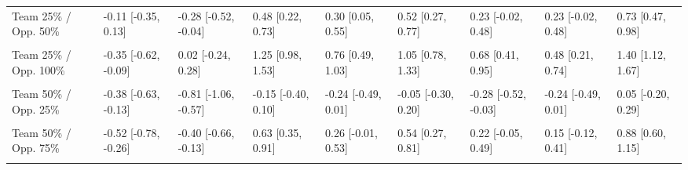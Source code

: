 \documentclass[]{elsarticle} %
\begin{document}
\begin{landscape}
\begin{table}
{\begin{tabular}[t]{lllllllll}
Team 25\% / Opp. 50\% & -0.11 [-0.35, 0.13] & -0.28 [-0.52, -0.04] & 0.48 [0.22, 0.73] & 0.30 [0.05, 0.55] & 0.52 [0.27, 0.77] & 0.23 [-0.02, 0.48] & 0.23 [-0.02, 0.48] & 0.73 [0.47, 0.98]\\
\cellcolor{gray!6}{Team 25\% / Opp. 75\%} & \cellcolor{gray!6}{-0.22 [-0.47, 0.03]} & \cellcolor{gray!6}{-0.13 [-0.38, 0.12]} & \cellcolor{gray!6}{0.87 [0.61, 1.13]} & \cellcolor{gray!6}{0.51 [0.26, 0.77]} & \cellcolor{gray!6}{0.79 [0.53, 1.05]} & \cellcolor{gray!6}{0.49 [0.23, 0.74]} & \cellcolor{gray!6}{0.42 [0.17, 0.67]} & \cellcolor{gray!6}{1.13 [0.87, 1.39]}\\
Team 25\% / Opp. 100\% & -0.35 [-0.62, -0.09] & 0.02 [-0.24, 0.28] & 1.25 [0.98, 1.53] & 0.76 [0.49, 1.03] & 1.05 [0.78, 1.33] & 0.68 [0.41, 0.95] & 0.48 [0.21, 0.74] & 1.40 [1.12, 1.67]\\
\addlinespace
\cellcolor{gray!6}{Team 50\% / Opp. 0\%} & \cellcolor{gray!6}{-0.34 [-0.58, -0.10]} & \cellcolor{gray!6}{-1.04 [-1.27, -0.80]} & \cellcolor{gray!6}{-0.57 [-0.81, -0.34]} & \cellcolor{gray!6}{-0.52 [-0.75, -0.29]} & \cellcolor{gray!6}{-0.37 [-0.60, -0.14]} & \cellcolor{gray!6}{-0.54 [-0.77, -0.31]} & \cellcolor{gray!6}{-0.42 [-0.65, -0.19]} & \cellcolor{gray!6}{-0.37 [-0.60, -0.15]}\\
Team 50\% / Opp. 25\% & -0.38 [-0.63, -0.13] & -0.81 [-1.06, -0.57] & -0.15 [-0.40, 0.10] & -0.24 [-0.49, 0.01] & -0.05 [-0.30, 0.20] & -0.28 [-0.52, -0.03] & -0.24 [-0.49, 0.01] & 0.05 [-0.20, 0.29]\\
\cellcolor{gray!6}{Team 50\% / Opp. 50\%} & \cellcolor{gray!6}{-0.40 [-0.67, -0.14]} & \cellcolor{gray!6}{-0.54 [-0.81, -0.28]} & \cellcolor{gray!6}{0.23 [-0.04, 0.50]} & \cellcolor{gray!6}{0.05 [-0.22, 0.31]} & \cellcolor{gray!6}{0.27 [0.00, 0.54]} & \cellcolor{gray!6}{-0.03 [-0.30, 0.23]} & \cellcolor{gray!6}{-0.05 [-0.31, 0.22]} & \cellcolor{gray!6}{0.48 [0.21, 0.75]}\\
Team 50\% / Opp. 75\% & -0.52 [-0.78, -0.26] & -0.40 [-0.66, -0.13] & 0.63 [0.35, 0.91] & 0.26 [-0.01, 0.53] & 0.54 [0.27, 0.81] & 0.22 [-0.05, 0.49] & 0.15 [-0.12, 0.41] & 0.88 [0.60, 1.15]\\
\cellcolor{gray!6}{Team 50\% / Opp. 100\%} & \cellcolor{gray!6}{-0.65 [-0.93, -0.37]} & \cellcolor{gray!6}{-0.24 [-0.52, 0.03]} & \cellcolor{gray!6}{1.01 [0.72, 1.30]} & \cellcolor{gray!6}{0.51 [0.22, 0.79]} & \cellcolor{gray!6}{0.81 [0.52, 1.10]} & \cellcolor{gray!6}{0.42 [0.13, 0.71]} & \cellcolor{gray!6}{0.20 [-0.08, 0.48]} & \cellcolor{gray!6}{1.15 [0.86, 1.44]}\\

\end{tabular}}
\end{table}
\end{landscape}
\end{document}
